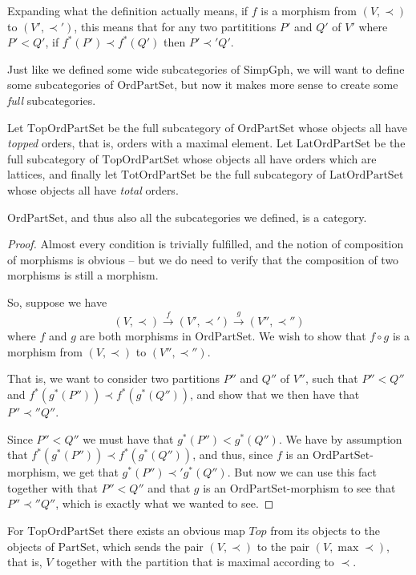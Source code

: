 \documentclass[a4paper,reqno,oneside]{article} %
\begin{document}
Expanding what the definition actually means, if $f$ is a morphism from $(V,\prec)$ to $(V',\prec')$, this means that for any two partititions $P'$ and $Q'$ of $V'$ where $P' < Q'$, if $f^*(P') \prec f^*(Q')$ then $P' \prec' Q'$.

Just like we defined some wide subcategories of $\mathrm{SimpGph}$, we will want to define some subcategories of $\mathrm{OrdPartSet}$, but now it makes more sense to create some \emph{full} subcategories.

\begin{definition}
Let $\mathrm{TopOrdPartSet}$ be the full subcategory of $\mathrm{OrdPartSet}$ whose objects all have \emph{topped} orders, that is, orders with a maximal element. Let $\mathrm{LatOrdPartSet}$ be the full subcategory of $\mathrm{TopOrdPartSet}$ whose objects all have orders which are lattices, and finally let $\mathrm{TotOrdPartSet}$ be the full subcategory of $\mathrm{LatOrdPartSet}$ whose objects all have \emph{total} orders.
\end{definition}

\begin{lemma}
$\mathrm{OrdPartSet}$, and thus also all the subcategories we defined, is a category.
\begin{proof}
Almost every condition is trivially fulfilled, and the notion of composition of morphisms is obvious -- but we do need to verify that the composition of two morphisms is still a morphism.

So, suppose we have
$$(V, \prec) \xrightarrow{f} (V', \prec') \xrightarrow{g} (V'', \prec'')$$
where $f$ and $g$ are both morphisms in $\mathrm{OrdPartSet}$. We wish to show that $f\circ g$ is a morphism from $(V, \prec)$ to $(V'',\prec'')$.

That is, we want to consider two partitions $P''$ and $Q''$ of $V''$, such that $P'' < Q''$ and $f^*(g^*(P'')) \prec f^*(g^*(Q''))$, and show that we then have that $P'' \prec'' Q''$.

Since $P'' < Q''$ we must have that $g^*(P'') < g^*(Q'')$. We have by assumption that $f^*(g^*(P'')) \prec f^*(g^*(Q''))$, and thus, since $f$ is an $\mathrm{OrdPartSet}$-morphism, we get that $g^*(P'') \prec' g^*(Q'')$. But now we can use this fact together with that $P'' < Q''$ and that $g$ is an $\mathrm{OrdPartSet}$-morphism to see that $P'' \prec'' Q''$, which is exactly what we wanted to see.
\end{proof}
\end{lemma}

For $\mathrm{TopOrdPartSet}$ there exists an obvious map $Top$ from its objects to the objects of $\mathrm{PartSet}$, which sends the pair $(V,\prec)$ to the pair $(V,\max \prec)$, that is, $V$ together with the partition that is maximal according to $\prec$.
\end{document}
